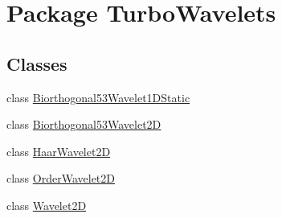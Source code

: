 \hypertarget{namespace_turbo_wavelets}{\section{Package Turbo\+Wavelets}
\label{namespace_turbo_wavelets}
}
\subsection*{Classes}
\begin{DoxyCompactItemize}
\item 
class \hyperlink{class_turbo_wavelets_1_1_biorthogonal53_wavelet1_d_static}{Biorthogonal53\+Wavelet1\+D\+Static}
\item 
class \hyperlink{class_turbo_wavelets_1_1_biorthogonal53_wavelet2_d}{Biorthogonal53\+Wavelet2\+D}
\item 
class \hyperlink{class_turbo_wavelets_1_1_haar_wavelet2_d}{Haar\+Wavelet2\+D}
\item 
class \hyperlink{class_turbo_wavelets_1_1_order_wavelet2_d}{Order\+Wavelet2\+D}
\item 
class \hyperlink{class_turbo_wavelets_1_1_wavelet2_d}{Wavelet2\+D}
\end{DoxyCompactItemize}

